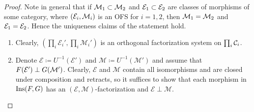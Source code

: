 \begin{proof}
Note in general that if $\mathcal{M}_1\subset \mathcal{M}_2$ and $\mathcal{E}_1\subset \mathcal{E}_2$ are classes of morphisms of some category, where $(\mathcal{E}_i,\mathcal{M}_i)$ is an OFS for $i = 1,2$, then $\mathcal{M}_1 = \mathcal{M}_2$ and $\mathcal{E}_1 = \mathcal{E}_2$. Hence the uniqueness claims of the statement hold.
\begin{enumerate}
   \item Clearly, $(\prod_i \mathcal{E}_i',\prod_i \mathcal{M}_i')$ is an orthogonal factorization system on $\prod_i \mathcal{C}_i$.

   \item Denote $\mathcal{E} \coloneqq U^{-1}(\mathcal{E}')$ and $\mathcal{M} \coloneqq U^{-1}(\mathcal{M}')$ and assume that $F(\mathcal{E}')\perp G(\mathcal{M}')$. Clearly, $\mathcal{E}$ and $\mathcal{M}$ contain all isomorphisms and are closed under composition and retracts, so it suffices to show that each morphism in $\mathrm{Ins}(F,G)$ has an $(\mathcal{E},\mathcal{M})$-factorization and $\mathcal{E}\perp \mathcal{M}$.


\end{enumerate}
\end{proof}

